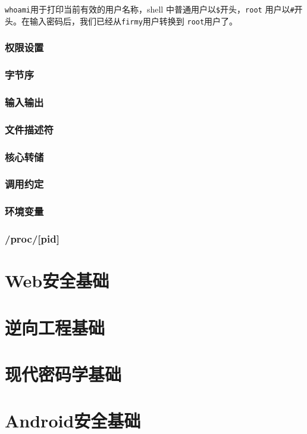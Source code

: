 \indent \verb+whoami+用于打印当前有效的用户名称，shell 中普通用户以\verb+$+开头，\verb+root+ 用户以\verb+#+开头。在输入密码后，我们已经从\verb+firmy+用户转换到 \verb+root+用户了。

\subsubsection{权限设置}
\indent \setlength{\parindent}{2em}

\subsubsection{字节序}
\indent \setlength{\parindent}{2em}

\subsubsection{输入输出}
\indent \setlength{\parindent}{2em}

\subsubsection{文件描述符}
\indent \setlength{\parindent}{2em}

\subsubsection{核心转储}
\indent \setlength{\parindent}{2em}

\subsubsection{调用约定}
\indent \setlength{\parindent}{2em}

\subsubsection{环境变量}
\indent \setlength{\parindent}{2em}

\subsubsection{/proc/[pid]}
\indent \setlength{\parindent}{2em}

\section{Web安全基础}
\indent \setlength{\parindent}{2em}

\section{逆向工程基础}
\indent \setlength{\parindent}{2em}

\section{现代密码学基础}
\indent \setlength{\parindent}{2em}

\section{Android安全基础}
\indent \setlength{\parindent}{2em}
